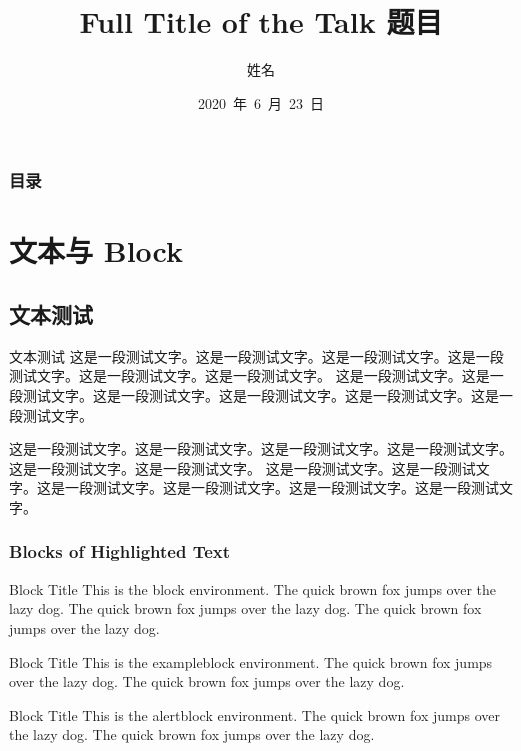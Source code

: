 \documentclass[notheorems]{beamer}
\title[Short 题目]{Full Title of the Talk 题目} %
\author{姓名}  %
\institute[NU] %
{
Name of University \\ %
\medskip
\textit{name@email.com} %
}
\date[2020.6.23]{2020~年~6~月~23~日} %
\theoremstyle{plain}
\numberwithin{theorem}{section}
\numberwithin{definition}{section}
\numberwithin{lemma}{section}
\numberwithin{proposition}{section}
\numberwithin{corollary}{section}
\theoremstyle{example}
\numberwithin{figure}{section}
\numberwithin{table}{section}
\numberwithin{equation}{section}
\begin{document}
\begin{frame}
\titlepage
\end{frame}

\begin{frame}
\frametitle{目录}
\tableofcontents%
\end{frame}


\section{文本与 Block}
\subsection{文本测试}

\begin{frame}{文本测试}
这是一段测试文字。这是一段测试文字。这是一段测试文字。这是一段测试文字。这是一段测试文字。这是一段测试文字。
这是一段测试文字。这是一段测试文字。这是一段测试文字。这是一段测试文字。这是一段测试文字。这是一段测试文字。

\vspace{1ex}
这是一段测试文字。这是一段测试文字。这是一段测试文字。这是一段测试文字。这是一段测试文字。这是一段测试文字。
这是一段测试文字。这是一段测试文字。这是一段测试文字。这是一段测试文字。这是一段测试文字。这是一段测试文字。

\end{frame}


\begin{frame}
\frametitle{Blocks of Highlighted Text}
\begin{block}{Block Title}
This is the block environment. The quick brown fox jumps over the lazy dog. The quick brown fox jumps over the lazy dog. The quick brown fox jumps over the lazy dog.
\end{block}

\begin{exampleblock}{Block Title}
This is the exampleblock environment. The quick brown fox jumps over the lazy dog. The quick brown fox jumps over the lazy dog.
\end{exampleblock}

\begin{alertblock}{Block Title}
This is the alertblock environment. The quick brown fox jumps over the lazy dog. The quick brown fox jumps over the lazy dog.
\end{alertblock}
\end{frame}
\end{document}
